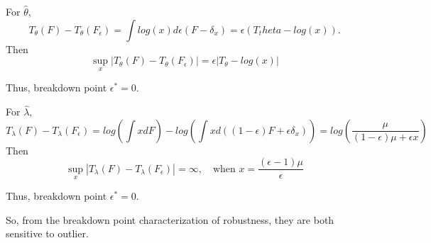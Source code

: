 \begin{solution}
    For $\hat{\theta}$, 
    \begin{equation*}
        T_\theta(F) - T_\theta(F_\epsilon) = \int log(x) d \epsilon (F -\delta_x)
        = \epsilon (T_theta - log(x)).
    \end{equation*}
    Then
    \begin{equation*}
        \sup_x | T_\theta(F) - T_\theta(F_\epsilon) | = \epsilon |T_\theta - log(x)|
    \end{equation*}

    Thus, breakdown point $\epsilon^* = 0$.

    For $\hat{\lambda}$, 
    \begin{equation*}
        T_\lambda(F) - T_\lambda(F_\epsilon) = log( \int x d F ) - log( \int x d( (1-\epsilon)F + \epsilon \delta_x))
        = log(\frac{\mu}{(1-\epsilon)\mu + \epsilon x})
    \end{equation*}
    Then
    \begin{equation*}
        \sup_x | T_\lambda(F) - T_\lambda(F_\epsilon) | 
        =  \infty,
        \quad \text{when } x = \frac{(\epsilon - 1)\mu}{\epsilon}
    \end{equation*}

    Thus, breakdown point $\epsilon^* = 0$.

    So, from the breakdown point characterization of robustness, they are both sensitive to outlier. 
\end{solution}


